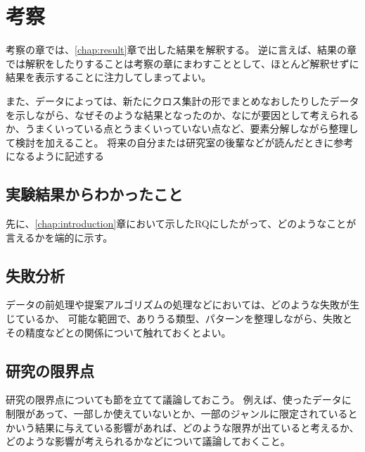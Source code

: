 \chapter{考察}
\label{chap:discussion}

考察の章では、\ref{chap:result}章で出した結果を解釈する。
逆に言えば、結果の章では解釈をしたりすることは考察の章にまわすこととして、ほとんど解釈せずに結果を表示することに注力してしまってよい。

また、データによっては、新たにクロス集計の形でまとめなおしたりしたデータを示しながら、なぜそのような結果となったのか、なにが要因として考えられるか、うまくいっている点とうまくいっていない点など、要素分解しながら整理して検討を加えること。
将来の自分または研究室の後輩などが読んだときに参考になるように記述する

\section{実験結果からわかったこと}

先に、\ref{chap:introduction}章において示したRQにしたがって、どのようなことが言えるかを端的に示す。

\section{失敗分析}

データの前処理や提案アルゴリズムの処理などにおいては、どのような失敗が生じているか、
可能な範囲で、ありうる類型、パターンを整理しながら、失敗とその精度などとの関係について触れておくとよい。

\section{研究の限界点}

研究の限界点についても節を立てて議論しておこう。
例えば、使ったデータに制限があって、一部しか使えていないとか、一部のジャンルに限定されているとかいう結果に与えている影響があれば、どのような限界が出ていると考えるか、どのような影響が考えられるかなどについて議論しておくこと。
